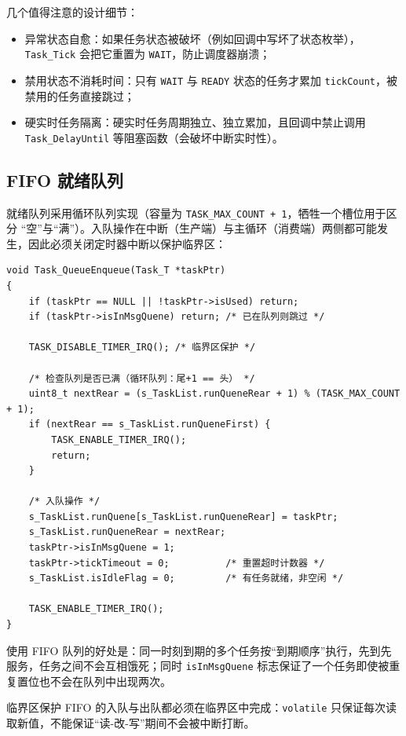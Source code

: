 几个值得注意的设计细节：

\begin{itemize}
\item 异常状态自愈：如果任务状态被破坏（例如回调中写坏了状态枚举）， \texttt{Task\_Tick} 会把它重置为 \texttt{WAIT}，防止调度器崩溃；
\item 禁用状态不消耗时间：只有 \texttt{WAIT} 与 \texttt{READY} 状态的任务才累加 \texttt{tickCount}，被禁用的任务直接跳过；
\item 硬实时任务隔离：硬实时任务周期独立、独立累加，且回调中禁止调用 \texttt{Task\_DelayUntil} 等阻塞函数（会破坏中断实时性）。
\end{itemize}

\subsection{FIFO 就绪队列}

就绪队列采用循环队列实现（容量为 \texttt{TASK\_MAX\_COUNT + 1}，牺牲一个槽位用于区分 “空”与“满”）。入队操作在中断（生产端）与主循环（消费端）两侧都可能发生，因此必须关闭定时器中断以保护临界区：

\begin{lstlisting}[style=c]
void Task_QueueEnqueue(Task_T *taskPtr)
{
    if (taskPtr == NULL || !taskPtr->isUsed) return;
    if (taskPtr->isInMsgQuene) return; /* 已在队列则跳过 */

    TASK_DISABLE_TIMER_IRQ(); /* 临界区保护 */

    /* 检查队列是否已满（循环队列：尾+1 == 头） */
    uint8_t nextRear = (s_TaskList.runQueneRear + 1) % (TASK_MAX_COUNT + 1);
    if (nextRear == s_TaskList.runQueneFirst) {
        TASK_ENABLE_TIMER_IRQ();
        return;
    }

    /* 入队操作 */
    s_TaskList.runQuene[s_TaskList.runQueneRear] = taskPtr;
    s_TaskList.runQueneRear = nextRear;
    taskPtr->isInMsgQuene = 1;
    taskPtr->tickTimeout = 0;          /* 重置超时计数器 */
    s_TaskList.isIdleFlag = 0;         /* 有任务就绪，非空闲 */

    TASK_ENABLE_TIMER_IRQ();
}
\end{lstlisting}

使用 FIFO 队列的好处是：同一时刻到期的多个任务按“到期顺序”执行，先到先服务，任务之间不会互相饿死；同时 \texttt{isInMsgQuene} 标志保证了一个任务即使被重复置位也不会在队列中出现两次。

\begin{anybox}{临界区保护}
FIFO 的入队与出队都必须在临界区中完成：\texttt{volatile} 只保证每次读取新值，不能保证“读-改-写”期间不会被中断打断。
\end{anybox}

